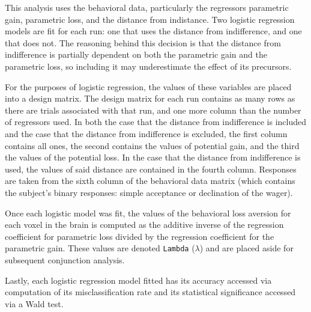 
\par This analysis uses the behavioral data, particularly the regressors
parametric gain, parametric loss, and the distance from indistance. Two logistic
regression models are fit for each run: one that uses the distance from
indifference, and one that does not. The reasoning behind this decision is that
the distance from indifference is partially dependent on both the parametric
gain and the parametric loss, so including it may underestimate the effect of
its precursors.

\par \indent For the purposes of logistic regression, the values of these
variables are placed into a design matrix. The design matrix for each run
contains as many rows as there are trials associated with that run, and one more
column than the number of regressors used. In both the case that the distance
from indifference is included and the case that the distance from indifference
is excluded, the first column contains all ones, the second contains the values
of potential gain, and the third the values of the potential loss. In the case
that the distance from indifference is used, the values of said distance are
contained in the fourth column. Responses are taken from the sixth column of the
behavioral data matrix (which contains the subject's binary responses: simple
acceptance or declination of the wager).

\par \indent Once each logistic model was fit, the values of the behavioral loss
aversion for each voxel in the brain is computed as the additive inverse of the
regression coefficient for parametric loss divided by the regression coefficient
for the parametric gain. These values are denoted \texttt{Lambda} ($\lambda$)
and are placed aside for subsequent conjunction analysis.

\par \indent Lastly, each logistic regression model fitted has its accuracy 
accessed via computation of its misclassification rate and its statistical
significance accessed via a Wald test.
